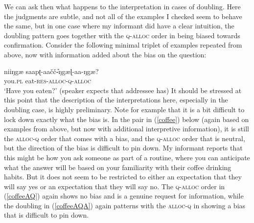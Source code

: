\documentclass[output=paper, modfonts, nonflat]{langsci/langscibook}
\begin{document}
We can ask then what happens to the interpretation in cases of
doubling. Here the judgments are subtle, and not all of the examples I
checked seem to behave the same, but in one case where my informant
did have a clear intuition, the doubling pattern goes together with
the \textsc{q}-\textsc{alloc}{} order in being biased towards
confirmation. Consider the following minimal triplet of examples
repeated from above, now with information added about the bias on the
question: 

\ea
 \ex\label{youveeatenhaveyou}\gll niiŋgæ{}
 saapʈ-aa\v{c}\v{c}\U-ŋgæɭ-aa-ŋgæ?\\ 
 you.\textsc{pl} eat-\textsc{res}-\textsc{alloc}-\textsc{q}-\textsc{alloc}\\
 \glt `Have you eaten?' (speaker expects that addressee has)
 \z
\z
%
It should be stressed at this point that the description of the
interpretations here, especially in the doubling case, is highly
preliminary. Note for example that it is a bit difficult to lock down
exactly what the bias is. In the pair in (\ref{coffee}) below (again
based on examples from above, but now with additional interpretive
information), it is still the \textsc{alloc}{}-\textsc{q} order that comes
with a bias, and the \textsc{q}-\textsc{alloc}{} order that is neutral, but
the direction of the bias is difficult to pin down. My informant
reports that this might be how you ask someone as part of a routine,
where you can anticipate what the answer will be based on your
familiarity with their coffee drinking habits. But it does not seem to
be restricted to either an expectation that they will say yes or an
expectation that they will say no. The \textsc{q}-\textsc{alloc}{} order in
(\ref{coffeeAQ}) again shows no bias and is a genuine request for
information, while the doubling in (\ref{coffeeAQA}) again patterns
with the \textsc{alloc}{}-\textsc{q} in showing a bias that is difficult to
pin down.
\end{document}
